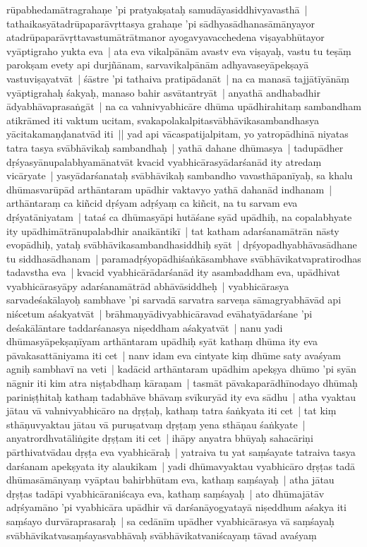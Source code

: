 \documentclass[article,a4paper]{memoir}
\begin{document}
rū\-pabhedamā\-tragrahaṇe 'pi pratyakṣataḥ samudā\-yasiddhivyavasthā\- | tathaikasyā\-tadrū\-paparā\-vṛttasya grahaṇe 'pi sā\-dhyasā\-dhanasā\-mā\-nyayor atadrū\-paparā\-vṛttavastumā\-trā\-tmanor ayogavyavacchedena viṣayabhū\-tayor vyā\-ptigraho yukta eva | ata eva vikalpā\-nā\-m avastv eva viṣayaḥ, vastu tu teṣā\-ṃ parokṣam evety api durjñā\-nam, sarvavikalpā\-nā\-m adhyavaseyā\-pekṣayā\- vastuviṣayatvā\-t | śā\-stre 'pi tathaiva pratipā\-danā\-t | na ca manasā\- tajjā\-tī\-yā\-nā\-ṃ vyā\-ptigrahaḥ śakyaḥ, manaso bahir asvā\-tantryā\-t | anyathā\- andhabadhir ā\-dyabhā\-vaprasaṅgā\-t | na ca vahnivyabhicā\-re dhū\-ma upā\-dhirahitaṃ sambandham atikrā\-med iti vaktum ucitam, svakapolakalpitasvā\-bhā\-vikasambandhasya yā\-citakamaṇḍanatvā\-d iti || \label{thakur75-109.27} yad api vā\-caspatijalpitam, yo yatropā\-dhinā\- niyatas tatra tasya svā\-bhā\-vikaḥ sambandhaḥ | yathā\- dahane dhū\-masya | tadupā\-dher dṛśyasyā\-nupalabhyamā\-natvā\-t kvacid vyabhicā\-rasyā\-darśanā\-d ity atredaṃ vicā\-ryate | yasyā\-darśanataḥ svā\-bhā\-vikaḥ sambandho vavasthā\-panī\-yaḥ, sa khalu dhū\-masvarū\-pā\-d arthā\-ntaram upā\-dhir vaktavyo yathā\- dahanā\-d indhanam | arthā\-ntaraṃ ca kiñcid dṛśyam adṛśyaṃ ca kiñcit, na tu sarvam eva dṛśyatā\-niyatam | tataś ca dhū\-masyā\-pi hutā\-śane syā\-d upā\-dhiḥ, na copalabhyate ity upā\-dhimā\-trā\-nupalabdhir anaikā\-ntikī\- | tat katham adarśanamā\-trā\-n nā\-sty evopā\-dhiḥ, yataḥ svā\-bhā\-vikasambandhasiddhiḥ syā\-t | dṛśyopadhyabhā\-vasā\-dhane tu siddhasā\-dhanam | paramadṛśyopā\-dhiśaṅkā\-sambhave svā\-bhā\-vikatvapratirodhas tadavstha eva | kvacid vyabhicā\-rā\-darśanā\-d ity asambaddham eva, upā\-dhivat vyabhicā\-rasyā\-py adarśanamā\-trā\-d abhā\-vā\-siddheḥ | vyabhicā\-rasya sarvadeśakā\-layoḥ sambhave 'pi sarvadā\- sarvatra sarveṇa sā\-magryabhā\-vā\-d api niścetum aśakyatvā\-t | brā\-hmaṇyā\-divyabhicā\-ravad evā\-hatyā\-darśane 'pi deśakā\-lā\-ntare taddarśanasya niṣeddham aśakyatvā\-t | \label{thakur75-110.7} nanu yadi dhū\-masyā\-pekṣaṇī\-yam arthā\-ntaram upā\-dhiḥ syā\-t kathaṃ dhū\-ma ity eva pā\-vakasattā\-niyama iti cet | nanv idam eva cintyate kiṃ dhū\-me saty avaśyam agniḥ sambhavī\- na veti | kadā\-cid arthā\-ntaram upā\-dhim apekṣya dhū\-mo 'pi syā\-n nā\-gnir iti kim atra niṣṭabdhaṃ kā\-raṇam | tasmā\-t pā\-vakaparā\-dhī\-nodayo dhū\-maḥ pariniṣṭhitaḥ kathaṃ tadabhā\-ve bhā\-vaṃ svī\-kuryā\-d ity eva sā\-dhu | \label{thakur75-110.12} atha vyaktau jā\-tau vā\- vahnivyabhicā\-ro na dṛṣṭaḥ, kathaṃ tatra śaṅkyata iti cet | tat kiṃ sthā\-ṇuvyaktau jā\-tau vā\- puruṣatvaṃ dṛṣṭaṃ yena sthā\-ṇau śaṅkyate | anyatrordhvatā\-liṅgite dṛṣṭam iti cet | ihā\-py anyatra bhū\-yaḥ sahacā\-riṇi pā\-rthivatvā\-dau dṛṣṭa eva vyabhicā\-raḥ | yatraiva tu yat saṃśayate tatraiva tasya darśanam apekṣyata ity alaukikam | yadi dhū\-mavyaktau vyabhicā\-ro dṛṣṭas tadā\- dhū\-masā\-mā\-nyaṃ vyā\-ptau bahirbhū\-tam eva, kathaṃ saṃśayaḥ | atha jā\-tau dṛṣṭas tadā\-pi vyabhicā\-raniścaya eva, kathaṃ saṃśayaḥ | ato dhū\-majā\-tā\-v adṛśyamā\-no 'pi vyabhicā\-ra upā\-dhir vā\- darśanā\-yogyatayā\- niṣeddhum aśakya iti saṃśayo durvā\-raprasaraḥ | sa cedā\-nī\-m upā\-dher vyabhicā\-rasya vā\- saṃśayaḥ svā\-bhā\-vikatvasaṃśayasvabhā\-vaḥ svā\-bhā\-vikatvaniścayaṃ tā\-vad avaśyaṃ 
\end{document}
